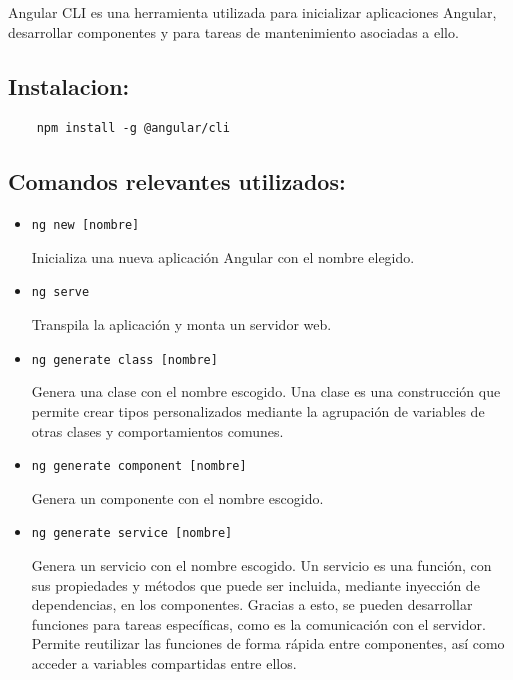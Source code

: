 \documentclass[openright,twoside,10pt]{book}
\begin{document}
    Angular CLI es una herramienta utilizada para inicializar aplicaciones
    Angular, desarrollar componentes y para tareas de mantenimiento
    asociadas a ello.
    
    \subsection{Instalacion:}\label{instalacion}
    
    \begin{verbatim}
    npm install -g @angular/cli
    \end{verbatim}
    
    \subsection{Comandos relevantes
    utilizados:}\label{comandos-relevantes-utilizados}
    
    \begin{itemize}
    \item
      \texttt{ng\ new\ {[}nombre{]}}
    
      Inicializa una nueva aplicación Angular con el nombre elegido.
    \item
      \texttt{ng\ serve}
    
      Transpila la aplicación y monta un servidor web.
    \item
      \texttt{ng\ generate\ class\ {[}nombre{]}}
    
      Genera una clase con el nombre escogido. Una clase es una construcción
      que permite crear tipos personalizados mediante la agrupación de
      variables de otras clases y comportamientos comunes.
    \item
      \texttt{ng\ generate\ component\ {[}nombre{]}}
    
      Genera un componente con el nombre escogido.
    \item
      \texttt{ng\ generate\ service\ {[}nombre{]}}
    
      Genera un servicio con el nombre escogido. Un servicio es una función,
      con sus propiedades y métodos que puede ser incluida, mediante
      inyección de dependencias, en los componentes. Gracias a esto, se
      pueden desarrollar funciones para tareas específicas, como es la
      comunicación con el servidor. Permite reutilizar las funciones de
      forma rápida entre componentes, así como acceder a variables
      compartidas entre ellos.
    \end{itemize}
    
\end{document}
